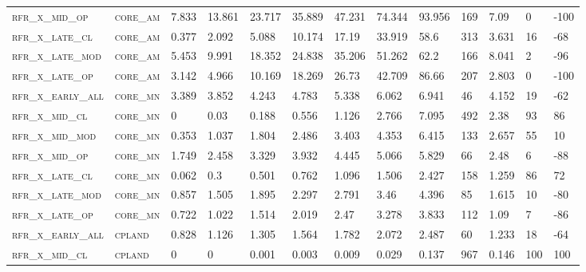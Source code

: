 \begin{landscape}
\begin{center}
\begin{footnotesize}
\begin{longtable}{lllllllllllll}
\textsc{rfr\_x\_mid\_op   } & \textsc{core\_am  }   & 7.833   & 13.861  & 23.717   & 35.889   & 47.231   & 74.344   & 93.956   & 169  & 7.09    & 0   & -100  \\
\textsc{rfr\_x\_late\_cl  } & \textsc{core\_am  }   & 0.377   & 2.092   & 5.088    & 10.174   & 17.19    & 33.919   & 58.6     & 313  & 3.631   & 16  & -68   \\
\textsc{rfr\_x\_late\_mod } & \textsc{core\_am  }   & 5.453   & 9.991   & 18.352   & 24.838   & 35.206   & 51.262   & 62.2     & 166  & 8.041   & 2   & -96   \\
\textsc{rfr\_x\_late\_op  } & \textsc{core\_am  }   & 3.142   & 4.966   & 10.169   & 18.269   & 26.73    & 42.709   & 86.66    & 207  & 2.803   & 0   & -100  \\
\textsc{rfr\_x\_early\_all} & \textsc{core\_mn  }   & 3.389   & 3.852   & 4.243    & 4.783    & 5.338    & 6.062    & 6.941    & 46   & 4.152   & 19  & -62   \\
\textsc{rfr\_x\_mid\_cl   } & \textsc{core\_mn  }   & 0       & 0.03    & 0.188    & 0.556    & 1.126    & 2.766    & 7.095    & 492  & 2.38    & 93  & 86    \\
\textsc{rfr\_x\_mid\_mod  } & \textsc{core\_mn  }   & 0.353   & 1.037   & 1.804    & 2.486    & 3.403    & 4.353    & 6.415    & 133  & 2.657   & 55  & 10    \\
\textsc{rfr\_x\_mid\_op   } & \textsc{core\_mn  }   & 1.749   & 2.458   & 3.329    & 3.932    & 4.445    & 5.066    & 5.829    & 66   & 2.48    & 6   & -88   \\
\textsc{rfr\_x\_late\_cl  } & \textsc{core\_mn  }   & 0.062   & 0.3     & 0.501    & 0.762    & 1.096    & 1.506    & 2.427    & 158  & 1.259   & 86  & 72    \\
\textsc{rfr\_x\_late\_mod } & \textsc{core\_mn  }   & 0.857   & 1.505   & 1.895    & 2.297    & 2.791    & 3.46     & 4.396    & 85   & 1.615   & 10  & -80   \\
\textsc{rfr\_x\_late\_op  } & \textsc{core\_mn  }   & 0.722   & 1.022   & 1.514    & 2.019    & 2.47     & 3.278    & 3.833    & 112  & 1.09    & 7   & -86   \\
\textsc{rfr\_x\_early\_all} & \textsc{cpland    }   & 0.828   & 1.126   & 1.305    & 1.564    & 1.782    & 2.072    & 2.487    & 60   & 1.233   & 18  & -64   \\
\textsc{rfr\_x\_mid\_cl   } & \textsc{cpland    }   & 0       & 0       & 0.001    & 0.003    & 0.009    & 0.029    & 0.137    & 967  & 0.146   & 100 & 100   \\

\end{longtable}
\end{footnotesize}
\end{center}
\end{landscape}
